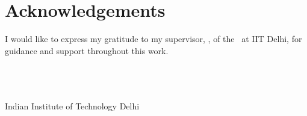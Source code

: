 \chapter*{Acknowledgements}

I would like to express my gratitude to my supervisor, \thesisguide, of the
\thesisdept\ at IIT Delhi, for guidance and support throughout this work.

\vspace{1cm}
\noindent\thesisauthor\\
\thesisentryno\\
\thesisdept\\
Indian Institute of Technology Delhi
